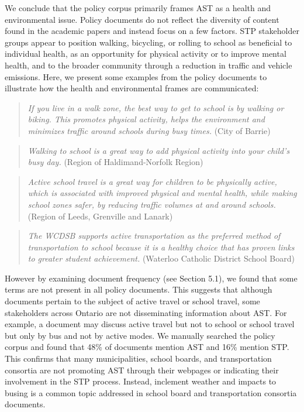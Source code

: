 \documentclass[]{elsarticle} %
\begin{document}
We conclude that the policy corpus primarily frames AST as a health and
environmental issue. Policy documents do not reflect the diversity of
content found in the academic papers and instead focus on a few factors.
STP stakeholder groups appear to position walking, bicycling, or rolling
to school as beneficial to individual health, as an opportunity for
physical activity or to improve mental health, and to the broader
community through a reduction in traffic and vehicle emissions. Here, we
present some examples from the policy documents to illustrate how the
health and environmental frames are communicated:

\begin{quote}
\emph{If you live in a walk zone, the best way to get to school is by
walking or biking. This promotes physical activity, helps the
environment and minimizes traffic around schools during busy times.}
(City of Barrie)
\end{quote}

\begin{quote}
\emph{Walking to school is a great way to add physical activity into
your child's busy day.} (Region of Haldimand-Norfolk Region)
\end{quote}

\begin{quote}
\emph{Active school travel is a great way for children to be physically
active, which is associated with improved physical and mental health,
while making school zones safer, by reducing traffic volumes at and
around schools.}(Region of Leeds, Grenville and Lanark)
\end{quote}

\begin{quote}
\emph{The WCDSB supports active transportation as the preferred method
of transportation to school because it is a healthy choice that has
proven links to greater student achievement.} (Waterloo Catholic
District School Board)
\end{quote}

However by examining document frequency (see Section 5.1), we found that
some terms are not present in all policy documents. This suggests that
although documents pertain to the subject of active travel or school
travel, some stakeholders across Ontario are not disseminating
information about AST. For example, a document may discuss active travel
but not to school or school travel but only by bus and not by active
modes. We manually searched the policy corpus and found that 48\% of
documents mention AST and 16\% mention STP. This confirms that many
municipalities, school boards, and transportation consortia are not
promoting AST through their webpages or indicating their involvement in
the STP process. Instead, inclement weather and impacts to busing is a
common topic addressed in school board and transportation consortia
documents.
\end{document}
